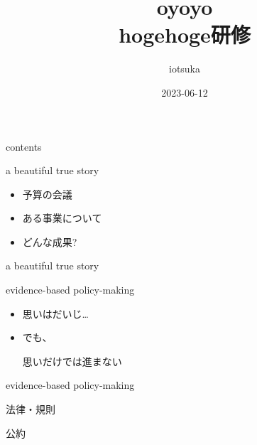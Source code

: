 \documentclass[
  ignorenonframetext,
]{beamer}
\title{oyoyo\\
hogehoge研修}
\author{iotsuka}
\date{2023-06-12}
\institute{piyopiyo}
\begin{document}
\frame{\titlepage}

\begin{frame}{contents}
\protect\hypertarget{contents}{}
\Huge

\end{frame}

\begin{frame}{a beautiful true story}
\protect\hypertarget{a-beautiful-true-story}{}
\Huge

\begin{itemize}
\item[\textbullet] 予算の会議
\item[\textbullet] ある事業について
\item[\textbullet] どんな成果?
\end{itemize}
\end{frame}

\begin{frame}{a beautiful true story}
\protect\hypertarget{a-beautiful-true-story-1}{}
\end{frame}

\begin{frame}{evidence-based policy-making}
\protect\hypertarget{evidence-based-policy-making}{}
\Huge

\begin{itemize}
\item 思いはだいじ\ldots\pause
\item でも、\par
思いだけでは進まない
\end{itemize}
\pause
\vspace*{-22pt}
\hspace*{18pt}
\end{frame}

\begin{frame}{evidence-based policy-making}
\protect\hypertarget{evidence-based-policy-making-1}{}
\Huge

法律・規則\pause

公約\pause

\scalebox{1.732}{\textcolor{red!40}{データ}}
\end{frame}
\end{document}
